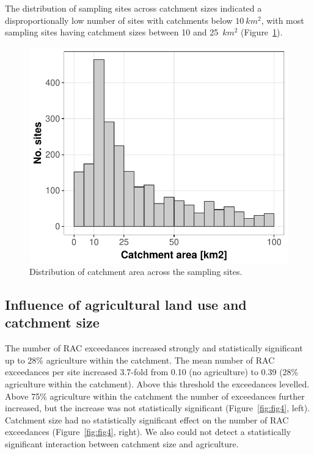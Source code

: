 \documentclass[journal=esthag,manuscript=article]{achemso}
\begin{document}
The distribution of sampling sites across catchment sizes indicated a disproportionally low number of sites with catchments below $10~km^2$, with
most sampling sites having catchment sizes between 10 and 25~$km^2$ (Figure~\ref{fig:fig3}). 


\begin{figure}[ht]
  \includegraphics[width=.8\textwidth]{figure3.pdf}
  \caption{Distribution of catchment area across the sampling sites.}
  \label{fig:fig3}
\end{figure}


\subsection{Influence of agricultural land use and catchment size}
The number of RAC exceedances increased strongly and statistically significant up to 28\% agriculture within the catchment.
The mean number of RAC exceedances per site increased 3.7-fold from 0.10 (no agriculture) to 0.39 (28\% agriculture within the catchment). 
Above this threshold the exceedances levelled.
Above 75\% agriculture within the catchment the number of exceedances further increased, but the increase was not statistically significant (Figure~\ref{fig:fig4}, left). 
Catchment size had no statistically significant effect on the number of RAC exceedances (Figure~\ref{fig:fig4}, right).
We also could not detect a statistically significant interaction between catchment size and agriculture. 
\end{document}
